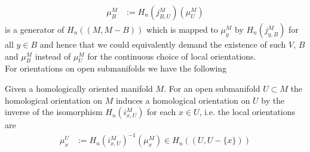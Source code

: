 \begin{align*}
  \mu_{B}^{M}
  &:=
  H_{n}(j_{B,U}^{M})(\mu_{U}^{M})
\end{align*}
is a generator of $H_{n}((M,M - B))$ which is mapped to $\mu_{y}^{M}$ by $H_{n}(j_{y,B}^{M})$ for all $y \in B$ and hence that we could equivalently demand the existence of such $V$, $B$ and $\mu_{B}^{M}$ instead of $\mu_{U}^{M}$ for the continuous choice of local orientations.
\\
For orientations on open submanifolds we have the following
\\
\begin{lem}
\label{lem:homorsub}
Given a homologically oriented manifold $M$. For an open submanifold $U \subset M$ the homological orientation on $M$ induces a homological orientation on $U$ by the inverse of the isomorphism $H_{n}(i_{x,U}^{M})$ for each $x \in U$, i.e. the local orientations are
\begin{align*}
  \mu_{x}^{U}
  &:=
  H_{n}(i_{x,U}^{M})^{-1}(\mu_{x}^{M})
  \in
  H_{n}((U,U - \lbrace x \rbrace))
\end{align*}
\end{lem}
